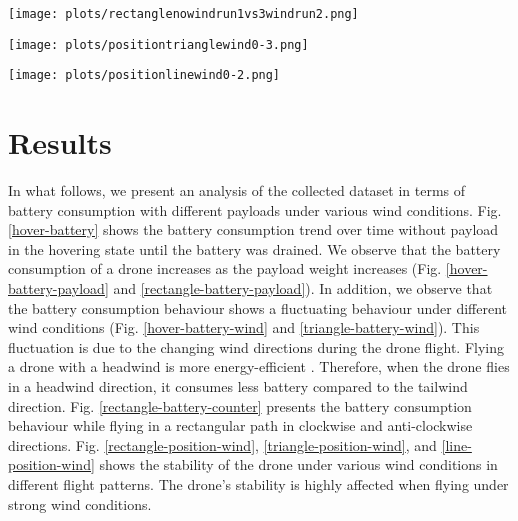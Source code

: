 \documentclass[runningheads]{llncs}
\begin{document}
\begin{figure*}[t]

\centering
  \texttt{[image: plots/rectanglenowindrun1vs3windrun2.png]}

\caption{Stability in Rectangular Path} \label{rectangle-position-wind}
\endminipage\hfill
{}%
\centering
  \texttt{[image: plots/positiontrianglewind0-3.png]}

\caption{Stability in Triangular Path} \label{triangle-position-wind}
\endminipage\hfill
{}
  \texttt{[image: plots/positionlinewind0-2.png]}

\caption{Stability in Linear Path} \label{line-position-wind}
\endminipage
\vspace{-0.6 cm}
\end{figure*}

\vspace{-0.4 cm}
\section{Results}
\vspace{-0.2 cm}
In what follows, we present an analysis of the collected dataset in terms of battery consumption with different payloads under various wind conditions. Fig. \ref{hover-battery} shows the battery consumption trend over time without payload in the hovering state until the battery was drained. We observe that the battery consumption of a drone increases as the payload weight increases (Fig. \ref{hover-battery-payload} and \ref{rectangle-battery-payload}).
In addition, we observe that the battery consumption behaviour shows a fluctuating behaviour under different wind conditions (Fig. \ref{hover-battery-wind} and \ref{triangle-battery-wind}). This fluctuation is due to the changing wind directions during the drone flight. Flying a drone with a headwind is more energy-efficient \cite{alyassi2021autonomous}. Therefore, when the drone flies in a headwind direction, it consumes less battery compared to the tailwind direction. Fig. \ref{rectangle-battery-counter} presents the battery consumption behaviour while flying in a rectangular path in clockwise and anti-clockwise directions. Fig. \ref{rectangle-position-wind}, \ref{triangle-position-wind}, and \ref{line-position-wind} shows the stability of the drone under various wind conditions in different flight patterns. The drone's stability is highly affected when flying under strong wind conditions.
\vspace{-0.2 cm}
\end{document}
